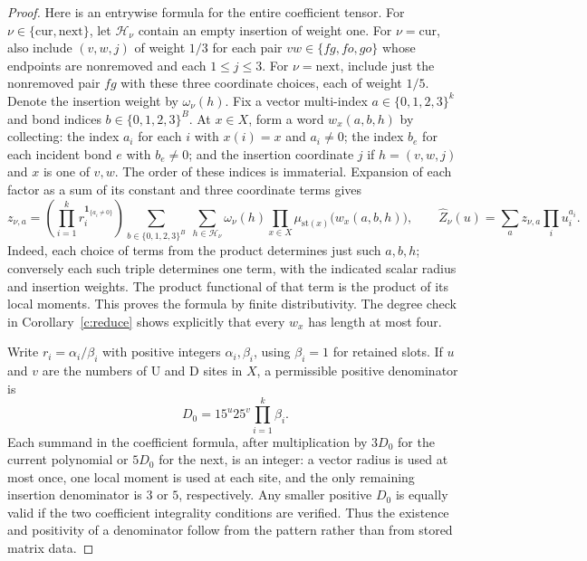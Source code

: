 \begin{proof}
Here is an entrywise formula for the entire coefficient tensor.
For \(\nu\in\{\mathrm{cur},\mathrm{next}\}\), let
\(\mathcal H_\nu\) contain an empty insertion of weight one.
For \(\nu=\mathrm{cur}\), also include \((v,w,j)\) of weight
\(1/3\) for each pair \(vw\in\{fg,fo,go\}\) whose endpoints are
nonremoved and each \(1\le j\le3\).  For
\(\nu=\mathrm{next}\), include just the nonremoved pair \(fg\)
with these three coordinate choices, each of weight \(1/5\).
Denote the insertion weight by \(\omega_\nu(h)\).
Fix a vector multi-index \(a\in\{0,1,2,3\}^k\) and bond
indices \(b\in\{0,1,2,3\}^{B}\).  At \(x\in X\), form a word
\(w_x(a,b,h)\) by collecting:
the index \(a_i\) for each \(i\) with \(x(i)=x\) and
\(a_i\ne0\); the index \(b_e\) for each incident bond \(e\)
with \(b_e\ne0\); and the insertion coordinate \(j\) if
\(h=(v,w,j)\) and \(x\) is one of \(v,w\).
The order of these indices is immaterial.  Expansion of each
factor as a sum of its constant and three coordinate terms gives
\[
 z_{\nu,a}=
 \left(\prod_{i=1}^k r_i^{\mathbf1_{\{a_i\ne0\}}}\right)
 \sum_{b\in\{0,1,2,3\}^{B}}\ \sum_{h\in\mathcal H_\nu}
 \omega_\nu(h)\prod_{x\in X}
          \mu_{\mathrm{st}(x)}\bigl(w_x(a,b,h)\bigr),
 \qquad
 \widehat Z_\nu(u)=\sum_a z_{\nu,a}\prod_i u_i^{a_i}.
\]
Indeed, each choice of terms from the product determines just
such \(a,b,h\); conversely each such triple determines one term,
with the indicated scalar radius and insertion weights.  The
product functional of that term is the product of its local
moments.  This proves the formula by finite distributivity.
The degree check in Corollary~\ref{c:reduce} shows explicitly
that every \(w_x\) has length at most four.

Write \(r_i=\alpha_i/\beta_i\) with positive integers
\(\alpha_i,\beta_i\), using \(\beta_i=1\) for retained slots.
If \(u\) and \(v\) are the numbers of \(\mathrm U\) and
\(\mathrm D\) sites in \(X\), a permissible positive denominator
is
\[
 D_0=15^u25^v\prod_{i=1}^k\beta_i.
\]
Each summand in the coefficient formula, after multiplication
by \(3D_0\) for the current polynomial or \(5D_0\) for the next,
is an integer: a vector radius is used at most once, one local
moment is used at each site, and the only remaining insertion
denominator is \(3\) or \(5\), respectively.  Any smaller
positive \(D_0\) is equally valid if the two coefficient
integrality conditions are verified.  Thus the existence and
positivity of a denominator follow from the pattern rather than
from stored matrix data.


\end{proof}
